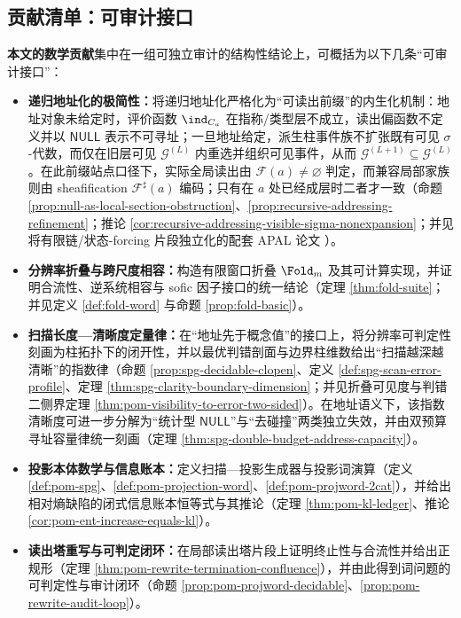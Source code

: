\subsection{贡献清单：可审计接口}\label{subsec:contrib-scope}
\textbf{本文的数学贡献}集中在一组可独立审计的结构性结论上，可概括为以下几条“可审计接口”：
\begin{itemize}
  \item \textbf{递归地址化的极简性：}将递归地址化严格化为“可读出前缀”的内生化机制：地址对象未给定时，评价函数 \(\ind_{C_a}\) 在指称/类型层不成立，读出偏函数不定义并以 \(\mathsf{NULL}\) 表示不可寻址；一旦地址给定，派生柱事件族不扩张既有可见 \(\sigma\)-代数，而仅在旧层可见 \(\mathcal{G}^{(L)}\) 内重选并组织可见事件，从而 \(\mathcal{G}^{(L+1)}\subseteq \mathcal{G}^{(L)}\)。在此前缀站点口径下，实际全局读出由 \(\mathscr F(a)\neq\varnothing\) 判定，而兼容局部家族则由 sheafification \(\mathscr F^\sharp(a)\) 编码；只有在 \(a\) 处已经成层时二者才一致（命题 \ref{prop:null-as-local-section-obstruction}、\ref{prop:recursive-addressing-refinement}；推论 \ref{cor:recursive-addressing-visible-sigma-nonexpansion}；并见将有限链/状态-forcing 片段独立化的配套 APAL 论文 \cite{MaZhang2026StateForcingSemantics}）。
  \item \textbf{分辨率折叠与跨尺度相容：}构造有限窗口折叠 \(\Fold_m\) 及其可计算实现，并证明合流性、逆系统相容与 sofic 因子接口的统一结论（定理 \ref{thm:fold-suite}；并见定义 \ref{def:fold-word} 与命题 \ref{prop:fold-basic}）。
  \item \textbf{扫描长度—清晰度定量律：}在“地址先于概念值”的接口上，将分辨率可判定性刻画为柱拓扑下的闭开性，并以最优判错剖面与边界柱维数给出“扫描越深越清晰”的指数律（命题 \ref{prop:spg-decidable-clopen}、定义 \ref{def:spg-scan-error-profile}、定理 \ref{thm:spg-clarity-boundary-dimension}；并见折叠可见度与判错二侧界定理 \ref{thm:pom-visibility-to-error-two-sided}）。在地址语义下，该指数清晰度可进一步分解为“统计型 \(\mathsf{NULL}\)”与“去碰撞”两类独立失效，并由双预算寻址容量律统一刻画（定理 \ref{thm:spg-double-budget-address-capacity}）。
  \item \textbf{投影本体数学与信息账本：}定义扫描—投影生成器与投影词演算（定义 \ref{def:pom-spg}、\ref{def:pom-projection-word}、\ref{def:pom-projword-2cat}），并给出相对熵缺陷的闭式信息账本恒等式与其推论（定理 \ref{thm:pom-kl-ledger}、推论 \ref{cor:pom-ent-increase-equals-kl}）。
  \item \textbf{读出塔重写与可判定闭环：}在局部读出塔片段上证明终止性与合流性并给出正规形（定理 \ref{thm:pom-rewrite-termination-confluence}），并由此得到词问题的可判定性与审计闭环（命题 \ref{prop:pom-projword-decidable}、\ref{prop:pom-rewrite-audit-loop}）。

\end{itemize}

